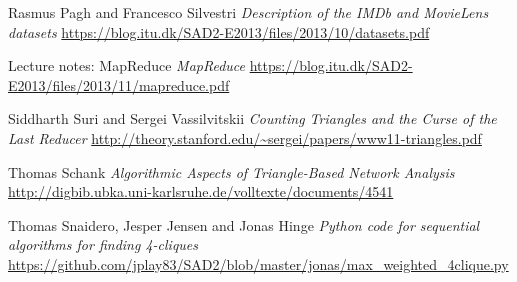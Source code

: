 \documentclass{article}
\begin{document}
\begin{thebibliography}{1}

    Rasmus Pagh and Francesco Silvestri
    \emph{Description of the IMDb and MovieLens datasets}
    \url{https://blog.itu.dk/SAD2-E2013/files/2013/10/datasets.pdf}

    Lecture notes: MapReduce
    \emph{MapReduce}
    \url{https://blog.itu.dk/SAD2-E2013/files/2013/11/mapreduce.pdf}

    Siddharth Suri and Sergei Vassilvitskii
    \emph{Counting Triangles and the Curse of the Last Reducer}
    \url{http://theory.stanford.edu/~sergei/papers/www11-triangles.pdf}

    Thomas Schank
    \emph{Algorithmic Aspects of Triangle-Based Network Analysis}
    \url{http://digbib.ubka.uni-karlsruhe.de/volltexte/documents/4541}

    Thomas Snaidero, Jesper Jensen and Jonas Hinge
    \emph{Python code for sequential algorithms for finding 4-cliques}
    \url{https://github.com/jplay83/SAD2/blob/master/jonas/max_weighted_4clique.py}
    
\end{thebibliography}
\end{document}
